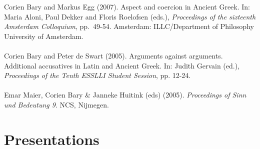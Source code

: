 \documentclass[a4paper,11pt]{article}
\begin{document}
Corien Bary and Markus Egg (2007). Aspect and coercion in Ancient Greek. In: Maria Aloni, Paul Dekker and Floris 
Roelofsen (eds.), \emph{Proceedings of the sixteenth Amsterdam Colloquium}, pp.\ 49-54.  Amsterdam: ILLC/Department of Philosophy 
University of Amsterdam.\\\\
Corien Bary and Peter de Swart (2005). Arguments against
arguments. Additional accusatives in Latin and Ancient Greek. In:
Judith Gervain (ed.), \emph{Proceedings of the Tenth ESSLLI
Student
Session}, pp. 12-24.\\\\
Emar Maier, Corien Bary \& Janneke Huitink (eds) (2005).
\emph{Proceedings of Sinn und Bedeutung 9}. NCS, Nijmegen.\\


\section*{Presentations}
\end{document}

